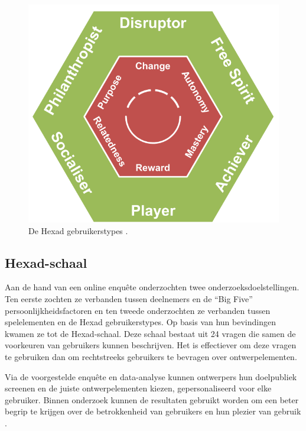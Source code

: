 \begin{figure}
    \includegraphics[width=\linewidth]{HexadUserTypes.png}
    \caption{De Hexad gebruikerstypes \autocite{Tondello2016}.}
    \label{fig:usertypes}
\end{figure}

\subsection{Hexad-schaal}

Aan de hand van een online enquête onderzochten \textcite{Tondello2016} twee onderzoeksdoelstellingen. Ten eerste zochten ze verbanden tussen deelnemers en de ``Big Five'' persoonlijkheidsfactoren en ten tweede onderzochten ze verbanden tussen spelelementen en de Hexad gebruikerstypes. Op basis van hun bevindingen kwamen ze tot de Hexad-schaal. Deze schaal bestaat uit 24 vragen die samen de voorkeuren van gebruikers kunnen beschrijven. Het is effectiever om deze vragen te gebruiken dan om rechtstreeks gebruikers te bevragen over ontwerpelementen.

Via de voorgestelde enquête en data-analyse kunnen ontwerpers hun doelpubliek screenen en de juiste ontwerpelementen kiezen, gepersonaliseerd voor elke gebruiker. Binnen onderzoek kunnen de resultaten gebruikt worden om een beter begrip te krijgen over de betrokkenheid van gebruikers en hun plezier van gebruik \autocite{Tondello2016}.